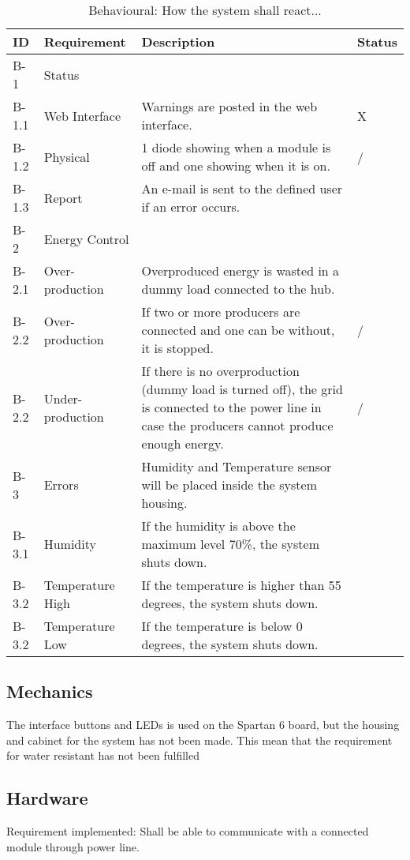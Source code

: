 \begin{table}[H]
	\begin{tabular} [b] {| p{1.1cm} |  p{2.5cm} | p{11.0cm} | p{1.0cm} |}
	\hline
	\textbf{ID} & \textbf{Requirement} & \textbf{Description} & Status\\\hline
		B-1 	&  Status 			& ~ & ~ \\ \hline
		B-1.1 & Web Interface	& Warnings are posted in the web interface. & X \\\hline
		B-1.2 & Physical		& 1 diode showing when a module is off and one showing when it is on. & / \\ \hline
		B-1.3 & Report			& An e-mail is sent to the defined user if an error occurs. & ~ \\\hline
		B-2 & Energy Control	& ~ & ~ \\\hline
		B-2.1 & Over-production	& Overproduced energy is wasted in a dummy load connected to the hub. & ~ \\\hline
		B-2.2 & Over-production	& If two or more producers are connected and one can be without, it is stopped. & / \\\hline
		B-2.2 & Under-production	& If there is no overproduction (dummy load is turned off), the grid is connected to the power line in case the producers cannot produce enough energy. & / \\\hline
		B-3 & Errors	 		& Humidity and Temperature sensor will be placed inside the system housing. & ~ \\\hline
		B-3.1 & Humidity		& If the humidity is above the maximum level 70\%, the system shuts down. & ~ \\\hline
		B-3.2 & Temperature High& If the temperature is higher than 55 degrees,  the system shuts down. & ~ \\\hline
		B-3.2 & Temperature Low & If the temperature is below 0 degrees, the system shuts down. & ~ \\\hline
	\end{tabular}
	\caption{Behavioural: How the system shall react...}
\end{table}

\subsection{Mechanics}
The interface buttons and LEDs is used on the Spartan 6 board, but the housing and cabinet for the system has not been made. This mean that the requirement for water resistant has not been fulfilled
\subsection{Hardware}
Requirement implemented: Shall be able to communicate with a connected module through power line.
